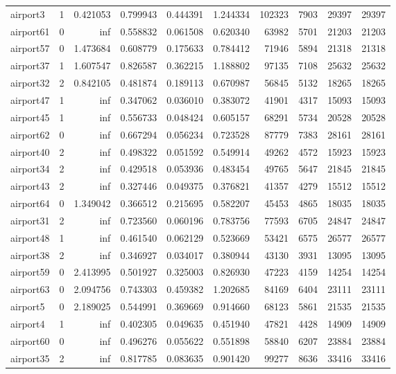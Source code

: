 \begin{longtable}{|l|r|r|r|r|r|r|r|r|r|}
airport3 & 1 & 0.421053 & 0.799943 & 0.444391 & 1.244334 & 102323 & 7903 & 29397 & 29397 \\
airport61 & 0 & inf & 0.558832 & 0.061508 & 0.620340 & 63982 & 5701 & 21203 & 21203 \\
airport57 & 0 & 1.473684 & 0.608779 & 0.175633 & 0.784412 & 71946 & 5894 & 21318 & 21318 \\
airport37 & 1 & 1.607547 & 0.826587 & 0.362215 & 1.188802 & 97135 & 7108 & 25632 & 25632 \\
airport32 & 2 & 0.842105 & 0.481874 & 0.189113 & 0.670987 & 56845 & 5132 & 18265 & 18265 \\
airport47 & 1 & inf & 0.347062 & 0.036010 & 0.383072 & 41901 & 4317 & 15093 & 15093 \\
airport45 & 1 & inf & 0.556733 & 0.048424 & 0.605157 & 68291 & 5734 & 20528 & 20528 \\
airport62 & 0 & inf & 0.667294 & 0.056234 & 0.723528 & 87779 & 7383 & 28161 & 28161 \\
airport40 & 2 & inf & 0.498322 & 0.051592 & 0.549914 & 49262 & 4572 & 15923 & 15923 \\
airport34 & 2 & inf & 0.429518 & 0.053936 & 0.483454 & 49765 & 5647 & 21845 & 21845 \\
airport43 & 2 & inf & 0.327446 & 0.049375 & 0.376821 & 41357 & 4279 & 15512 & 15512 \\
airport64 & 0 & 1.349042 & 0.366512 & 0.215695 & 0.582207 & 45453 & 4865 & 18035 & 18035 \\
airport31 & 2 & inf & 0.723560 & 0.060196 & 0.783756 & 77593 & 6705 & 24847 & 24847 \\
airport48 & 1 & inf & 0.461540 & 0.062129 & 0.523669 & 53421 & 6575 & 26577 & 26577 \\
airport38 & 2 & inf & 0.346927 & 0.034017 & 0.380944 & 43130 & 3931 & 13095 & 13095 \\
airport59 & 0 & 2.413995 & 0.501927 & 0.325003 & 0.826930 & 47223 & 4159 & 14254 & 14254 \\
airport63 & 0 & 2.094756 & 0.743303 & 0.459382 & 1.202685 & 84169 & 6404 & 23111 & 23111 \\
airport5 & 0 & 2.189025 & 0.544991 & 0.369669 & 0.914660 & 68123 & 5861 & 21535 & 21535 \\
airport4 & 1 & inf & 0.402305 & 0.049635 & 0.451940 & 47821 & 4428 & 14909 & 14909 \\
airport60 & 0 & inf & 0.496276 & 0.055622 & 0.551898 & 58840 & 6207 & 23884 & 23884 \\
airport35 & 2 & inf & 0.817785 & 0.083635 & 0.901420 & 99277 & 8636 & 33416 & 33416 \\

\end{longtable}
